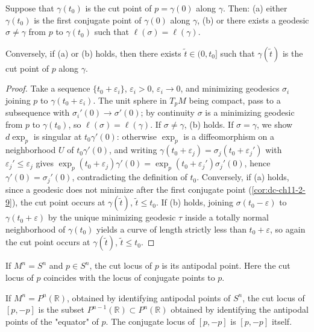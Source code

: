 \begin{proposition}
  \label{prop:dc-ch13-2-2}
  Suppose that $\gamma(t_0)$ is the cut point of $p=\gamma(0)$ along $\gamma$. Then:
  (a) either $\gamma(t_0)$ is the first conjugate point of $\gamma(0)$ along
    $\gamma$,
  (b) or there exists a geodesic $\sigma\neq\gamma$ from $p$ to $\gamma(t_0)$ such
    that $\ell(\sigma)=\ell(\gamma)$.

  Conversely, if (a) or (b) holds, then there exists $\tilde t\in(0,t_0]$ such that
  $\gamma(\tilde t)$ is the cut point of $p$ along $\gamma$.
\end{proposition}
\begin{proof}
\sketch
  Take a sequence $\{t_0+\varepsilon_i\}$, $\varepsilon_i>0$,
  $\varepsilon_i\to 0$, and minimizing geodesics $\sigma_i$ joining $p$ to
  $\gamma(t_0+\varepsilon_i)$. The unit sphere in $T_pM$ being compact, pass to a
  subsequence with $\sigma_i'(0)\to\sigma'(0)$; by continuity $\sigma$ is a
  minimizing geodesic from $p$ to $\gamma(t_0)$, so $\ell(\sigma)=\ell(\gamma)$. If
  $\sigma\neq\gamma$, (b) holds. If $\sigma=\gamma$, we show $d\exp_p$ is singular at
  $t_0\gamma'(0)$: otherwise $\exp_p$ is a diffeomorphism on a neighborhood $U$ of
  $t_0\gamma'(0)$, and writing $\gamma(t_0+\varepsilon_j)=\sigma_j(t_0+\varepsilon_j')$
  with $\varepsilon_j'\leq\varepsilon_j$ gives
  $\exp_p(t_0+\varepsilon_j)\gamma'(0)=\exp_p(t_0+\varepsilon_j')\sigma_j'(0)$, hence
  $\gamma'(0)=\sigma_j'(0)$, contradicting the definition of $t_0$. Conversely, if
  (a) holds, since a geodesic does not minimize after the first conjugate point
  (\cref{cor:dc-ch11-2-9}), the cut point occurs at
  $\gamma(\tilde t)$, $\tilde t\leq t_0$. If (b) holds, joining $\sigma(t_0-\varepsilon)$
  to $\gamma(t_0+\varepsilon)$ by the unique minimizing geodesic $\tau$ inside a
  totally normal neighborhood of $\gamma(t_0)$ yields a curve of length strictly less
  than $t_0+\varepsilon$, so again the cut point occurs at $\gamma(\tilde t)$,
  $\tilde t\leq t_0$.
\end{proof}

\begin{example}
  \label{ex:dc-ch13-2-3}
  If $M^n=S^n$ and $p\in S^n$, the cut locus of $p$ is its antipodal point. Here the
  cut locus of $p$ coincides with the locus of conjugate points to $p$.
\end{example}

\begin{example}
  \label{ex:dc-ch13-2-4}
  If $M^n=P^n(\mathbb{R})$, obtained by identifying antipodal points of $S^n$, the
  cut locus of $[p,-p]$ is the subset $P^{n-1}(\mathbb{R})\subset P^n(\mathbb{R})$
  obtained by identifying the antipodal points of the "equator" of $p$. The conjugate
  locus of $[p,-p]$ is $[p,-p]$ itself.
\end{example}

